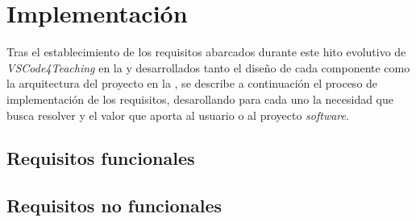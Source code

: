 \section{Implementación}
\label{sec:implementacion}
Tras el establecimiento de los requisitos abarcados durante este hito evolutivo de \textit{VSCode4Teaching} en la  y desarrollados tanto el diseño de cada componente como la arquitectura del proyecto en la , se describe a continuación el proceso de implementación de los requisitos, desarollando para cada uno la necesidad que busca resolver y el valor que aporta al usuario o al proyecto \textit{software}.

\subsection{Requisitos funcionales}
\label{subsec:reqsFuncionales}













\subsection{Requisitos no funcionales}
\label{subsec:reqsNoFuncionales}






